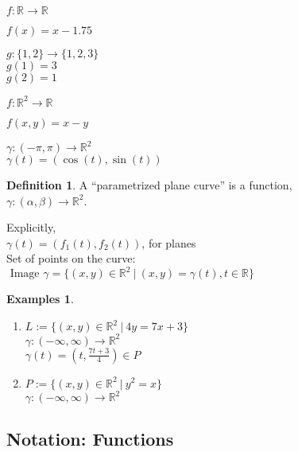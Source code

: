 \documentclass[twocolumn,20pt,fleqn]{extarticle}
\newcommand{\sep}{\vspace{0.5cm}}
\theoremstyle{plain}
\theoremstyle{definition}
\newtheorem*{definition}{Definition}
\newtheorem*{exmpls}{Examples}
\theoremstyle{remark}
\newenvironment*{examples}{\begin{exmpls} ~ \begin{enumerate}}{\end{enumerate}\end{exmpls}}
\begin{document}
$ f: \mathbb{R}  \to \mathbb{R}$

$f(x) = x - 1.75$\\

\sep

  $g : \{1,2\} \to \{1,2,3\}$\\
    $g(1) = 3$\\
    $g(2) = 1$\\

\sep

$ f: \mathbb{R}^2  \to \mathbb{R}$

$f(  x,y  ) = x - y$


\sep

$\gamma :  (-\pi,\pi)  \to \mathbb{R}^2$\\
$\gamma(t) = (\cos(t), \sin(t))$



\newpage



\begin{definition}
  A  ``parametrized plane curve''  is a  function,\\ $\gamma  : (\alpha, \beta) \to \mathbb{R}^2$.
\end{definition}

Explicitly,\\
$\gamma(t) = (f_1(t), f_2(t))$, for planes\\

Set of points on the curve:\\  $\textrm{ Image } \gamma = \{(x,y) \in \mathbb{R}^2 \ |\ (x,y) = \gamma(t), t \in \mathbb{R}\}$




\begin{examples}
  \item $L:=\{(x,y) \in \mathbb{R}^2\ |\ 4y = 7x + 3\}$\\
  $\gamma  : (-\infty,\infty) \to \mathbb{R}^2$ \\
  $\gamma(t) = (t, \frac{7t+3}{4})  \in P$\\
  \item $P:=\{(x,y) \in \mathbb{R}^2\ |\ y^2 = x\}$\\
  $\gamma  : (-\infty,\infty) \to \mathbb{R}^2$ \end{examples}


\clearpage




\subsection{Notation: Functions}
\end{document}

